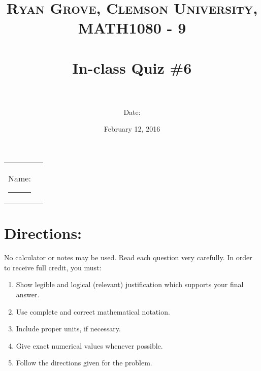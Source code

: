 \documentclass[paper=a4, fontsize=11pt]{scrartcl} %
\title{	
\normalfont \normalsize 
\textsc{Ryan Grove, Clemson University, MATH1080 - 9} \\ [25pt] %
\horrule{0.5pt} \\[0.4cm] %
\huge In-class Quiz \#6 \\ %
\horrule{2pt} \\[0.5cm] %
}
\author{Date:} %
\date{\normalsize February 12, 2016} %
\numberwithin{equation}{section} %
\numberwithin{figure}{section} %
\numberwithin{table}{section} %
\begin{document}
\maketitle %

\begin{flushleft}
\begin{tabular}{l l}
Name: \rule{3.2in}{.01cm}  & {}%
\end{tabular}
\end{flushleft}


\section*{\textbf{Directions:}}

No calculator or notes may be used.  Read each question very carefully.  In order to receive full credit, you must:
\begin{enumerate}
\item Show legible and logical (relevant) justification which supports your final answer.
\item Use complete and correct mathematical notation.
\item Include proper units, if necessary.
\item Give exact numerical values whenever possible.
\item Follow the directions given for the problem.
\end{enumerate}
\vspace{.1in}

\newpage
\end{document}
